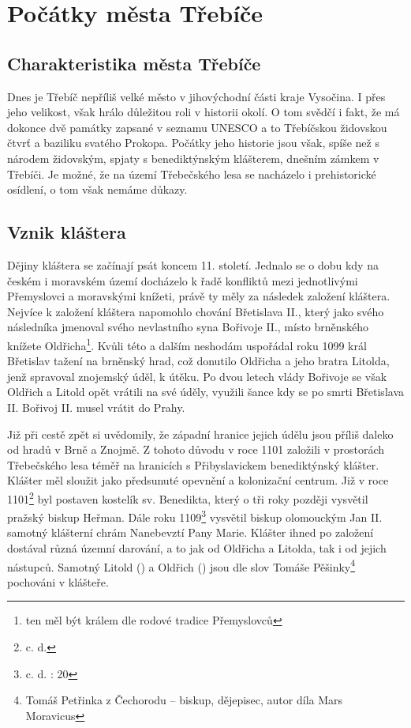 \documentclass[a4paper,oneside,12p]{report}
\begin{document}


\tableofcontents
\newpage




\setcounter{page}{1}

\chapter{Počátky města Třebíče}

\section{Charakteristika města Třebíče}

Dnes je Třebíč nepříliš velké město v jihovýchodní části kraje Vysočina.
I přes jeho velikost, však hrálo důležitou roli v historii okolí.
O tom svědčí i fakt, že má dokonce dvě památky zapsané v seznamu UNESCO a to Třebíčskou židovskou čtvrť a baziliku svatého Prokopa.
Počátky jeho historie jsou však, spíše než s národem židovským, spjaty s benediktýnským klášterem, dnešním zámkem v Třebíči.
Je možné, že na území Třebečského lesa se nacházelo i prehistorické osídlení, o tom však nemáme důkazy.

\section{Vznik kláštera}

Dějiny kláštera se začínají psát koncem 11. století.
Jednalo se o dobu kdy na českém i moravském území docházelo k řadě konfliktů mezi jednotlivými Přemyslovci a moravskými knížeti, právě ty měly za následek založení kláštera.
Nejvíce k založení kláštera napomohlo chování Břetislava II., který jako svého následníka jmenoval svého nevlastního syna Bořivoje II., místo brněnského knížete Oldřicha\footnote{ten měl být králem dle rodové tradice Přemyslovců}.
Kvůli této a dalším neshodám uspořádal roku 1099 král Břetislav tažení na brněnský hrad, což donutilo Oldřicha a jeho bratra Litolda, jenž spravoval znojemský úděl, k útěku.
Po dvou letech vlády Bořivoje se však Oldřich a Litold opět vrátili na své úděly, využili šance kdy se po smrti Břetislava II. Bořivoj II. musel vrátit do Prahy.

Již při cestě zpět si uvědomily, že západní hranice jejich údělu jsou příliš daleko od hradů v Brně a Znojmě.
Z tohoto důvodu v roce 1101 založili v prostorách Třebečského lesa téměř na hranicích s Přibyslavickem benediktýnský klášter.
Klášter měl sloužit jako předsunuté opevnění a kolonizační centrum.
Již v roce 1101\footnote{c. d. } byl postaven kostelík sv. Benedikta, který o tři roky později vysvětil pražský biskup Heřman.
Dále roku 1109\footnote{c. d. : 20} vysvětil biskup olomouckým Jan II. samotný klášterní chrám Nanebevztí Pany Marie.
Klášter ihned po založení dostával různá územní darování, a to jak od Oldřicha a Litolda, tak i od jejich nástupců.
Samotný Litold () a Oldřich () jsou dle slov Tomáše Pěšinky\footnote{Tomáš Petřinka z Čechorodu -- biskup, dějepisec, autor díla Mars Moravicus} pochováni v klášteře.
\end{document}

